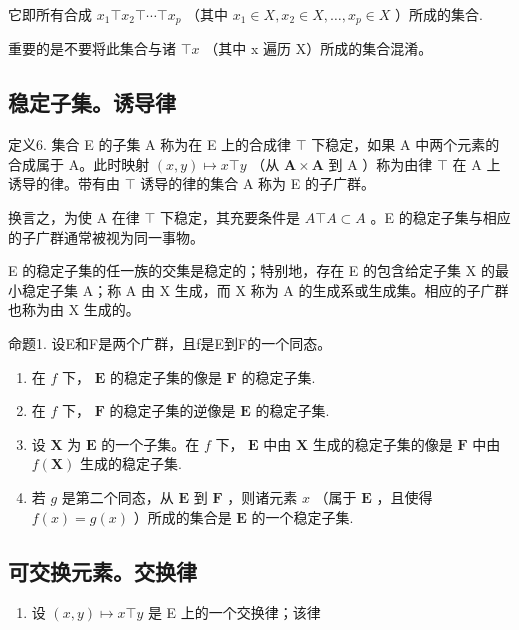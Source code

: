 它即所有合成 \(x_{1} \top x_{2} \top \cdots \top x_{p}\) （其中 \(x_{1} \in X, x_{2} \in X, \ldots, x_{p} \in X\) ）所成的集合.

重要的是不要将此集合与诸 \(\top x\) （其中 x 遍历 X）所成的集合混淆。

\subsection{稳定子集。诱导律}

定义6. 集合 E 的子集 A 称为在 E 上的合成律 \(\top\) 下稳定，如果 A 中两个元素的合成属于 A。此时映射 \((x,y)\mapsto x\top y\) （从 \(\mathbf{A}\times \mathbf{A}\) 到 A ）称为由律 \(\top\) 在 A 上诱导的律。带有由 \(\top\) 诱导的律的集合 A 称为 E 的子广群。

换言之，为使 A 在律 \(\top\) 下稳定，其充要条件是 \(A \top A \subset A\) 。E 的稳定子集与相应的子广群通常被视为同一事物。

E 的稳定子集的任一族的交集是稳定的；特别地，存在 E 的包含给定子集 X 的最小稳定子集 A；称 A 由 X 生成，而 X 称为 A 的生成系或生成集。相应的子广群也称为由 X 生成的。

命题1. 设E和F是两个广群，且f是E到F的一个同态。

\begin{enumerate}
\def\labelenumi{(\roman{enumi})}
\item
  在 \(f\) 下， \(\mathbf{E}\) 的稳定子集的像是 \(\mathbf{F}\) 的稳定子集.
\item
  在 \(f\) 下， \(\mathbf{F}\) 的稳定子集的逆像是 \(\mathbf{E}\) 的稳定子集.
\item
  设 \(\mathbf{X}\) 为 \(\mathbf{E}\) 的一个子集。在 \(f\) 下， \(\mathbf{E}\) 中由 \(\mathbf{X}\) 生成的稳定子集的像是 \(\mathbf{F}\) 中由 \(f(\mathbf{X})\) 生成的稳定子集.
\item
  若 \(g\) 是第二个同态，从 \(\mathbf{E}\) 到 \(\mathbf{F}\) ，则诸元素 \(x\) （属于 \(\mathbf{E}\) ，且使得 \(f(x) = g(x)\) ）所成的集合是 \(\mathbf{E}\) 的一个稳定子集.
\end{enumerate}

\subsection{可交换元素。交换律}

\begin{enumerate}
\def\labelenumi{(\arabic{enumi})}
\setcounter{enumi}{3}
\tightlist
\item
  设 \((x, y) \mapsto x \top y\) 是 E 上的一个交换律；该律
\end{enumerate}

